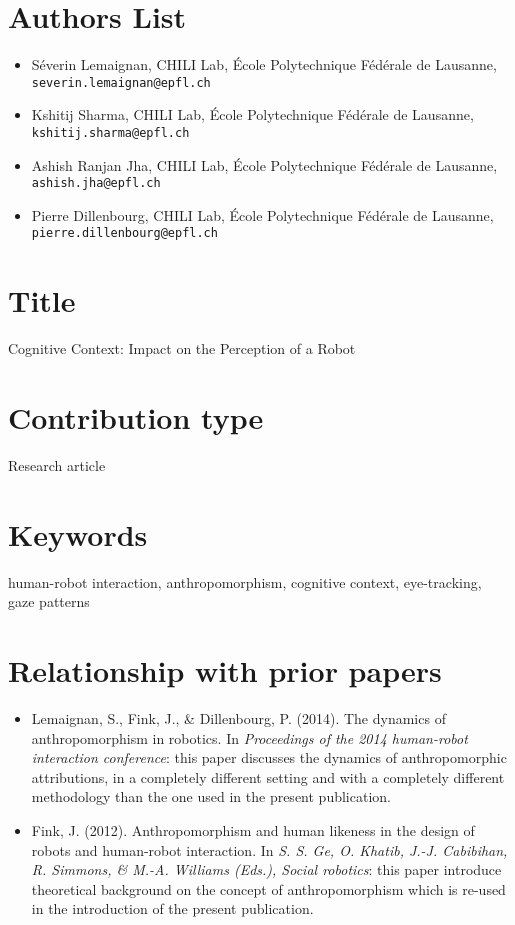 \documentclass{article}
\begin{document}
\section{Authors List}

\begin{itemize}
    \item Séverin Lemaignan, CHILI Lab, École Polytechnique Fédérale de
    Lausanne, \texttt{severin.lemaignan@epfl.ch} 
    \item Kshitij Sharma, CHILI Lab, École Polytechnique Fédérale de Lausanne,
    \texttt{kshitij.sharma@epfl.ch}
    \item Ashish Ranjan Jha, CHILI Lab, École Polytechnique Fédérale de
    Lausanne, \texttt{ashish.jha@epfl.ch}
    \item Pierre Dillenbourg, CHILI Lab, École Polytechnique Fédérale de
    Lausanne, \texttt{pierre.dillenbourg@epfl.ch}
\end{itemize}

\section{Title}

\begin{center}
{\sc Cognitive Context: Impact on the Perception of a Robot}
\end{center}

\section{Contribution type}

Research article

\section{Keywords}

human-robot interaction, anthropomorphism, cognitive context, eye-tracking, gaze patterns

\section{Relationship with prior papers}

\begin{itemize}
\item Lemaignan, S., Fink, J., \& Dillenbourg, P. (2014). The dynamics of
anthropomorphism in robotics. In \emph{Proceedings of the 2014 human-robot
interaction conference}: this paper discusses the dynamics of anthropomorphic
attributions, in a completely different setting and with a completely
different methodology than the one used in the present publication.
\item Fink, J. (2012). Anthropomorphism and human likeness in the design of
robots and human-robot interaction. In \emph{S. S. Ge, O. Khatib, J.-J.
Cabibihan, R. Simmons, \& M.-A. Williams (Eds.), Social robotics}: this paper
introduce theoretical background on the concept of anthropomorphism which is
re-used in the introduction of the present publication.
\end{itemize}
\end{document}
